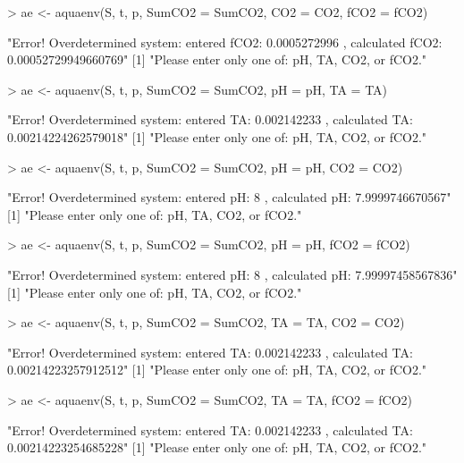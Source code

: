 \documentclass[article,nojss]{jss}
\begin{document}
\begin{scriptsize}
\begin{Schunk}
\begin{Sinput}
> ae <- aquaenv(S, t, p, SumCO2 = SumCO2, CO2 = CO2, fCO2 = fCO2)
\end{Sinput}
\begin{Soutput}
[1] "Error! Overdetermined system: entered fCO2: 0.0005272996 , calculated fCO2: 0.00052729949660769"
[1] "Please enter only one of: pH, TA, CO2, or fCO2."
\end{Soutput}
\begin{Sinput}
> ae <- aquaenv(S, t, p, SumCO2 = SumCO2, pH = pH, TA = TA)
\end{Sinput}
\begin{Soutput}
[1] "Error! Overdetermined system: entered TA: 0.002142233 , calculated TA: 0.00214224262579018"
[1] "Please enter only one of: pH, TA, CO2, or fCO2."
\end{Soutput}
\begin{Sinput}
> ae <- aquaenv(S, t, p, SumCO2 = SumCO2, pH = pH, CO2 = CO2)
\end{Sinput}
\begin{Soutput}
[1] "Error! Overdetermined system: entered pH: 8 , calculated pH: 7.9999746670567"
[1] "Please enter only one of: pH, TA, CO2, or fCO2."
\end{Soutput}
\begin{Sinput}
> ae <- aquaenv(S, t, p, SumCO2 = SumCO2, pH = pH, fCO2 = fCO2)
\end{Sinput}
\begin{Soutput}
[1] "Error! Overdetermined system: entered pH: 8 , calculated pH: 7.99997458567836"
[1] "Please enter only one of: pH, TA, CO2, or fCO2."
\end{Soutput}
\begin{Sinput}
> ae <- aquaenv(S, t, p, SumCO2 = SumCO2, TA = TA, CO2 = CO2)
\end{Sinput}
\begin{Soutput}
[1] "Error! Overdetermined system: entered TA: 0.002142233 , calculated TA: 0.00214223257912512"
[1] "Please enter only one of: pH, TA, CO2, or fCO2."
\end{Soutput}
\begin{Sinput}
> ae <- aquaenv(S, t, p, SumCO2 = SumCO2, TA = TA, fCO2 = fCO2)
\end{Sinput}
\begin{Soutput}
[1] "Error! Overdetermined system: entered TA: 0.002142233 , calculated TA: 0.00214223254685228"
[1] "Please enter only one of: pH, TA, CO2, or fCO2."
\end{Soutput}
\end{Schunk}
\end{scriptsize}
\end{document}
